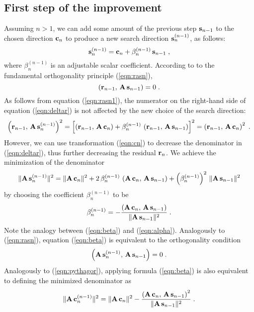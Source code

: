 \subsection{First step of the improvement}
Assuming $n>1$, we can add some
amount of the previous step ${\bf s}_{n-1}$ to the chosen direction
${\bf c}_n$ to produce a new search direction ${\bf s}_n^{(n-1)}$, as
follows:
\begin{equation}
{\bf s}_n^{(n-1)} =  {\bf c}_n + \beta_n^{(n-1)}\,{\bf s}_{n-1}\;,
\label{eqn:cn}
\end{equation}
where $\beta_n^{(n-1)}$ is an adjustable scalar coefficient. According to
to the fundamental orthogonality principle (\ref{eqn:rasn}), 
\begin{equation}
\left({\bf
r}_{n-1},\,{\bf A\,s}_{n-1}\right) = 0\;.  
\label{eqn:rasn1}
\end{equation}
As follows from equation (\ref{eqn:rasn1}), the numerator on the right-hand
side of equation (\ref{eqn:deltar}) is not affected by the new choice of the
search direction:
\begin{equation}
\left({\bf r}_{n-1},\,{\bf A\,s}_n^{(n-1)}\right)^2 = \left[
\left({\bf r}_{n-1},\,{\bf A\,c}_n\right) + \beta_n^{(n-1)}\,
\left({\bf r}_{n-1},\,{\bf A\,s}_{n-1}\right)\right]^2 =
\left({\bf r}_{n-1},\,{\bf A\,c}_n\right)^2\;.
\label{eqn:numerator}
\end{equation}
However, we can use transformation (\ref{eqn:cn}) to decrease the
denominator in (\ref{eqn:deltar}), thus further decreasing the residual
${\bf r}_n$. We achieve the minimization of the denominator
\begin{equation}
\|{\bf A\,s}_n^{(n-1)}\|^2 =  \|{\bf A\,c}_n\|^2 + 
2\,\beta_n^{(n-1)}\,\left({\bf A\,c}_n,\,{\bf A\,s}_{n-1}\right) +
\left(\beta_n^{(n-1)}\right)^2\,\|{\bf A\,s}_{n-1}\|^2
\label{eqn:denominator}
\end{equation} 
by choosing the coefficient $\beta_n^{(n-1)}$ to be
\begin{equation}
\beta_n^{(n-1)} = - {{\left({\bf A\,c}_n,\,{\bf A\,s}_{n-1}\right)} \over
{\|{\bf A\,s}_{n-1}\|^2}}\;.
\label{eqn:beta}
\end{equation}
Note the analogy between (\ref{eqn:beta}) and (\ref{eqn:alpha}). Analogously to
(\ref{eqn:rasn}), equation (\ref{eqn:beta}) is equivalent to the orthogonality condition
\begin{equation}
\left({\bf A\,s}_n^{(n-1)},\,{\bf A\,s}_{n-1}\right) = 0\;.
\label{eqn:acas}
\end{equation}
Analogously to (\ref{eqn:pythagor}), applying formula (\ref{eqn:beta}) is also equivalent to defining the
minimized denominator as
\begin{equation}
\|{\bf A\,c}_n^{(n-1)}\|^2 =  \|{\bf A\,c}_n\|^2 -
{{\left({\bf A\,c}_n,\,{\bf A\,s}_{n-1}\right)^2} \over
{\|{\bf A\,s}_{n-1}\|^2}}\;.
\label{eqn:pithagor2}
\end{equation}

